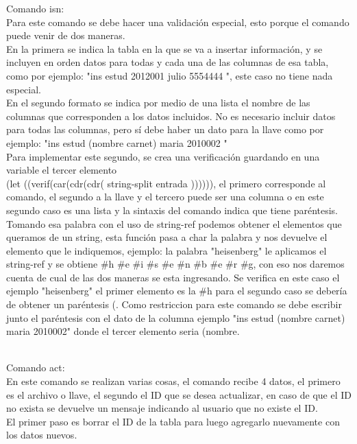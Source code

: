 \documentclass[12pt,a4paper]{report}
\begin{document}
\begin{flushleft}
Comando isn:\\
Para este comando se debe hacer una validación especial, esto porque el comando puede venir de dos maneras.\\
En la primera se indica la tabla en la que se va a insertar información, y se incluyen en orden datos para todas y cada una de las columnas de esa tabla, como por ejemplo:
"ins estud 2012001 julio 5554444 ", este caso no tiene nada especial.\\
En el segundo formato se indica por medio de una lista el nombre de las columnas que corresponden a los datos incluidos. No es necesario incluir datos para todas las
columnas, pero sí debe haber un dato para la llave como por ejemplo: "ins estud (nombre carnet) maria 2010002 "\\
Para implementar este segundo, se crea una verificación guardando en una variable el tercer elemento\\
(let ((verif(car(cdr(cdr( string-split entrada )))))), el primero corresponde al comando, el segundo a la llave y el tercero puede ser una columna o en este segundo caso es una lista y la sintaxis del comando indica que tiene paréntesis. Tomando esa palabra con el uso de string-ref podemos obtener el elementos que queramos de un string, esta función pasa a char la palabra y nos devuelve el elemento que le indiquemos, ejemplo: la palabra "heisenberg" le aplicamos el string-ref y se obtiene $\#$h $\#$e $\#$i $\#$s $\#$e $\#$n $\#$b $\#$e $\#$r $\#$g, con eso nos daremos cuenta de cual de las dos maneras se esta ingresando. Se verifica en este caso el ejemplo "heisenberg" el primer elemento es la $\#$h para el segundo caso se debería de obtener un paréntesis (. Como restriccion para este comando se debe escribir junto el paréntesis con el dato de la columna ejemplo "ins estud (nombre carnet) maria 2010002" donde el tercer elemento seria (nombre.\\\

Comando act:\\
En este comando se realizan varias cosas, el comando recibe 4 datos, el primero es el archivo o llave, el segundo el ID que se desea actualizar, en caso 
de que el ID no exista se devuelve un mensaje indicando al usuario que no existe el ID.\\
El primer paso es borrar el ID de la tabla para luego agregarlo nuevamente con los datos nuevos.\\\


\end{flushleft}
\end{document}
